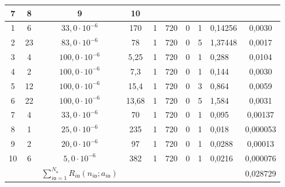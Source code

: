 \begin{table}
\begin{center}
\begin{tabular}{|c|c|c|c|c|c|c|c|l|c|}
\textbf{7}&\textbf{8}&\multicolumn{1}{c|}{\textbf{9}}&\multicolumn{1}{c|}{\textbf{10}}\\


\hline


1&\hphantom{9}6&$33{,}0\cdot 10^{-6}$&170&1&720&0&1&0,14256&0,0030\\


2&23&$83{,}0\cdot 10^{-6}$&\hphantom{9}78&1&720&0&5&1,37448&0,0017\\


3&\hphantom{9}4&$100{,}0\cdot 10^{-6}$\hphantom{9}&\hphantom{9999,}5,25&1&720&0&1&0,288&0,0104\\


4&\hphantom{9}2&$100{,}0\cdot 10^{-6}$\hphantom{9}&\hphantom{999,}7,3&1&720&0&1&0,144&0,0030\\


5&12&$100{,}0\cdot 10^{-6}$\hphantom{9}&\hphantom{,99}15,4&1&720&0&3&0,864&0,0059\\


6&22&$100{,}0\cdot 10^{-6}$\hphantom{9}&\hphantom{,999}13,68&1&720&0&5&1,584&0,0031\\


7&\hphantom{9}4&$33{,}0\cdot 10^{-6}$&\hphantom{9}70&1&720&0&1&0,095&\hphantom{9}0,00137\\


8&\hphantom{9}1&$25{,}0\cdot 10^{-6}$&235&1&720&0&1&0,018&\hphantom{99}0,000053\\


9&\hphantom{9}2&$20{,}0\cdot 10^{-6}$&\hphantom{9}97&1&720&0&1&0,0288&\hphantom{9}0,00013\\


10\hphantom{9}&\hphantom{9}6&\hphantom{9}$5{,}0\cdot 10^{-6}$&382&1&720&0&1&0,0216&\hphantom{99}0,000076\\


\hline


&&$\sum\limits^{N_{\mathrm{о}}}_{i\mathrm{о}=1} 


R_{i\mathrm{о}}(n_{i\mathrm{о}}; a_{i\mathrm{о}})$&&&&&&&\hphantom{99}0,028729\\


\hline


\end{tabular}


\end{center}


\end{table}


     


